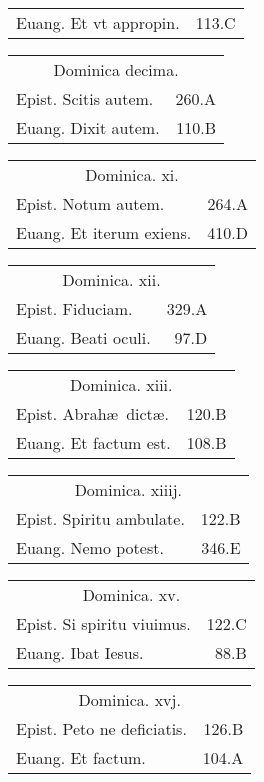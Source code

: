 \documentclass[a5paper,10pt]{book}
\def\ae{æ}
\begin{document}
\begin{multicols}{2}
\begin{tabular}{l r}
Euang. Et vt appropin. & 113.C\\
\end{tabular}
\begin{tabular}{l r}
\multicolumn{2}{c}{\color{red} Dominica decima.}\\
Epist. Scitis autem. & 260.A\\
Euang. Dixit autem. & 110.B\\
\end{tabular}
\begin{tabular}{l r}
\multicolumn{2}{c}{\color{red} Dominica. xi.}\\
Epist. Notum autem. & 264.A\\
Euang. Et iterum exiens. & 410.D\\
\end{tabular}
\begin{tabular}{l r}
\multicolumn{2}{c}{\color{red} Dominica. xii.}\\
Epist. Fiduciam. & 329.A\\
Euang. Beati oculi. & 97.D\\
\end{tabular}
\begin{tabular}{l r}
\multicolumn{2}{c}{\color{red} Dominica. xiii.}\\
Epist. Abrah\ae \ dict\ae . & 120.B\\
Euang. Et factum est. & 108.B\\
\end{tabular}
\begin{tabular}{l r}
\multicolumn{2}{c}{\color{red} Dominica. xiiij.}\\
Epist. Spiritu ambulate. & 122.B\\
Euang. Nemo potest. & 346.E\\
\end{tabular}
\begin{tabular}{l r}
\multicolumn{2}{c}{\color{red} Dominica. xv.}\\
Epist. Si spiritu viuimus. & 122.C\\
Euang. Ibat Iesus. & 88.B\\
\end{tabular}
\begin{tabular}{l r}
\multicolumn{2}{c}{\color{red} Dominica. xvj.}\\
Epist. Peto ne deficiatis. & 126.B\\
Euang. Et factum. & 104.A\\
\end{tabular}
\begin{tabular}{l r}

\end{tabular}
\end{multicols}
\end{document}
